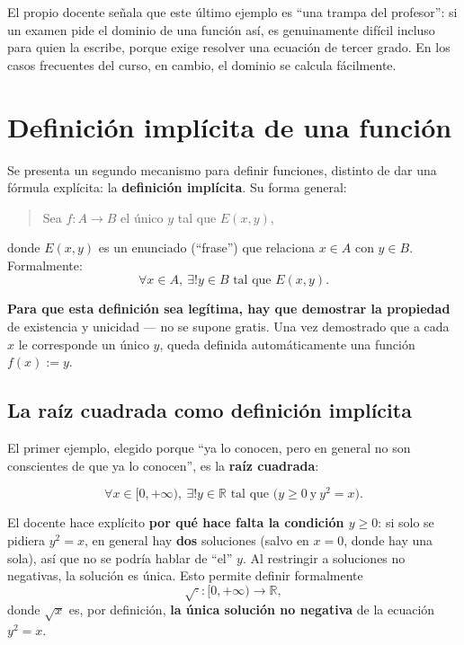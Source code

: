 \documentclass[12pt,a4paper]{article}
\begin{document}
\begin{notebox}
El propio docente señala que este último ejemplo es ``una trampa del profesor'': si un examen pide el dominio de una función así, es genuinamente difícil incluso para quien la escribe, porque exige resolver una ecuación de tercer grado. En los casos frecuentes del curso, en cambio, el dominio se calcula fácilmente.
\end{notebox}

\section{Definición implícita de una función}

Se presenta un segundo mecanismo para definir funciones, distinto de dar una fórmula explícita: la \textbf{definición implícita}. Su forma general:

\begin{quote}
Sea $f : A \to B$ el único $y$ tal que $E(x,y)$,
\end{quote}

donde $E(x,y)$ es un enunciado (``frase'') que relaciona $x \in A$ con $y \in B$. Formalmente:
$$\forall x \in A,\ \exists! y \in B \text{ tal que } E(x,y).$$

\textbf{Para que esta definición sea legítima, hay que demostrar la propiedad} de existencia y unicidad --- no se supone gratis. Una vez demostrado que a cada $x$ le corresponde un único $y$, queda definida automáticamente una función $f(x) := y$.

\subsection{La raíz cuadrada como definición implícita}

El primer ejemplo, elegido porque ``ya lo conocen, pero en general no son conscientes de que ya lo conocen'', es la \textbf{raíz cuadrada}:

$$\forall x \in [0,+\infty),\ \exists! y \in \mathbb{R} \text{ tal que } \big(y \geq 0 \ \text{y}\ y^2 = x\big).$$

El docente hace explícito \textbf{por qué hace falta la condición $y \geq 0$}: si solo se pidiera $y^2 = x$, en general hay \textbf{dos} soluciones (salvo en $x=0$, donde hay una sola), así que no se podría hablar de ``el'' $y$. Al restringir a soluciones no negativas, la solución es única. Esto permite definir formalmente
$$\sqrt{\cdot} : [0,+\infty) \to \mathbb{R},$$
donde $\sqrt{x}$ es, por definición, \textbf{la única solución no negativa} de la ecuación $y^2 = x$.
\end{document}
